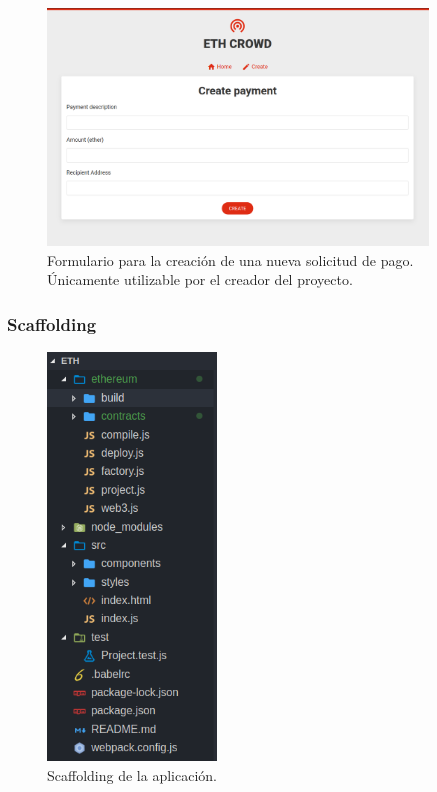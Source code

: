 \begin{figure}[H] 
\centering    
\includegraphics[width=0.9\textwidth]{new-payment}
\caption[new-payment]{Formulario para la creación de una nueva solicitud de pago. Únicamente utilizable por el creador del proyecto.}
\label{fig:new-payment}
\end{figure}


\subsubsection{Scaffolding}

\begin{figure}[H] 
\centering    
\includegraphics[width=0.4\textwidth]{scaffolding}
\caption[scaffolding]{Scaffolding de la aplicación.}
\label{fig:scaffolding}
\end{figure}


